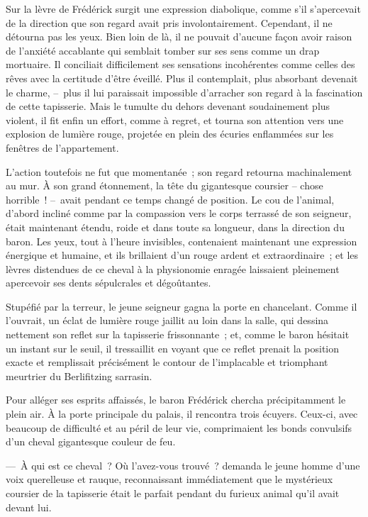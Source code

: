 \documentclass[french,twoside]{book} %
\begin{document}
Sur la lèvre de Frédérick surgit une expression diabolique, comme s’il s’apercevait de la direction que son regard avait pris involontairement. Cependant, il ne détourna pas les yeux. Bien loin de là, il ne pouvait d’aucune façon avoir raison de l’anxiété accablante qui semblait tomber sur ses sens comme un drap mortuaire. Il conciliait difficilement ses sensations incohérentes comme celles des rêves avec la certitude d’être éveillé. Plus il contemplait, plus absorbant devenait le charme, – plus il lui paraissait impossible d’arracher son regard à la fascination de cette tapisserie. Mais le tumulte du dehors devenant soudainement plus violent, il fit enfin un effort, comme à regret, et tourna son attention vers une explosion de lumière rouge, projetée en plein des écuries enflammées sur les fenêtres de l’appartement.\par
L’action toutefois ne fut que momentanée ; son regard retourna machinalement au mur. À son grand étonnement, la tête du gigantesque coursier – chose horrible ! – avait pendant ce temps changé de position. Le cou de l’animal, d’abord incliné comme par la compassion vers le corps terrassé de son seigneur, était maintenant étendu, roide et dans toute sa longueur, dans la direction du baron. Les yeux, tout à l’heure invisibles, contenaient maintenant une expression énergique et humaine, et ils brillaient d’un rouge ardent et extraordinaire ; et les lèvres distendues de ce cheval à la physionomie enragée laissaient pleinement apercevoir ses dents sépulcrales et dégoûtantes.\par
Stupéfié par la terreur, le jeune seigneur gagna la porte en chancelant. Comme il l’ouvrait, un éclat de lumière rouge jaillit au loin dans la salle, qui dessina nettement son reflet sur la tapisserie frissonnante ; et, comme le baron hésitait un instant sur le seuil, il tressaillit en voyant que ce reflet prenait la position exacte et remplissait précisément le contour de l’implacable et triomphant meurtrier du Berlifitzing sarrasin.\par
Pour alléger ses esprits affaissés, le baron Frédérick chercha précipitamment le plein air. À la porte principale du palais, il rencontra trois écuyers. Ceux-ci, avec beaucoup de difficulté et au péril de leur vie, comprimaient les bonds convulsifs d’un cheval gigantesque couleur de feu.\par
— À qui est ce cheval ? Où l’avez-vous trouvé ? demanda le jeune homme d’une voix querelleuse et rauque, reconnaissant immédiatement que le mystérieux coursier de la tapisserie était le parfait pendant du furieux animal qu’il avait devant lui.\par
\end{document}
